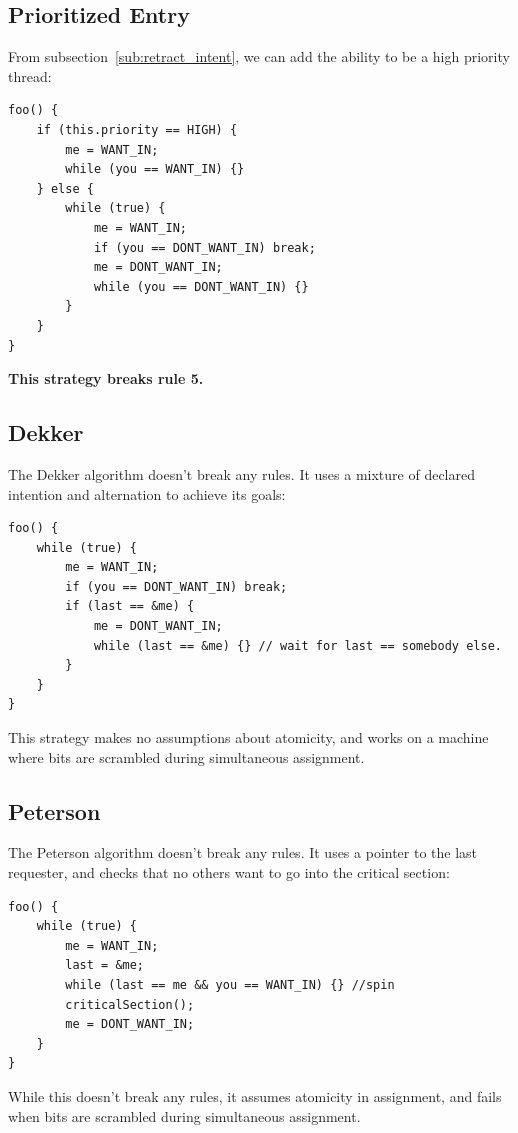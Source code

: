             \subsection{Prioritized Entry} %
            \label{sub:prioritized_entry}
                From subsection~\ref{sub:retract_intent}, we can add the ability to be a high priority thread:
                \begin{lstlisting}
foo() {
    if (this.priority == HIGH) {
        me = WANT_IN;
        while (you == WANT_IN) {}
    } else {
        while (true) {
            me = WANT_IN;
            if (you == DONT_WANT_IN) break;
            me = DONT_WANT_IN;
            while (you == DONT_WANT_IN) {}
        }
    }
}
                \end{lstlisting}
                \textbf{This strategy breaks rule 5.}
            \subsection{Dekker} %
            \label{sub:dekker}
                The Dekker algorithm doesn't break any rules.
                It uses a mixture of declared intention and alternation to achieve its goals:
                \begin{lstlisting}
foo() {
    while (true) {
        me = WANT_IN;
        if (you == DONT_WANT_IN) break;
        if (last == &me) {
            me = DONT_WANT_IN;
            while (last == &me) {} // wait for last == somebody else.
        }
    }
}
                \end{lstlisting}
                This strategy makes no assumptions about atomicity, and works on a machine where bits are scrambled during simultaneous assignment.
            \subsection{Peterson} %
            \label{sub:peterson}
                The Peterson algorithm doesn't break any rules.
                It uses a pointer to the last requester, and checks that no others want to go into the critical section:
                \begin{lstlisting}
foo() {
    while (true) {
        me = WANT_IN;
        last = &me;
        while (last == me && you == WANT_IN) {} //spin
        criticalSection();
        me = DONT_WANT_IN;
    }
}
                \end{lstlisting}
                While this doesn't break any rules, it assumes atomicity in assignment, and fails when bits are scrambled during simultaneous assignment.
